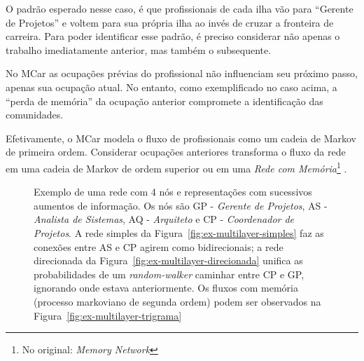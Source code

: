 \documentclass[12pt,a4paper]{article}
\begin{document}
O padrão esperado nesse caso, é que profissionais de cada ilha vão para \enquote{Gerente de Projetos} e voltem para sua própria ilha ao invés de cruzar a fronteira de carreira. Para poder identificar esse padrão, é preciso considerar não apenas o trabalho imediatamente anterior, mas também o subsequente.

No MCar as ocupações prévias do profissional não influenciam seu próximo passo, apenas sua ocupação atual. No entanto, como exemplificado no caso acima, a \enquote{perda de memória} da ocupação anterior compromete a identificação das comunidades.

Efetivamente, o MCar modela o fluxo de profissionais como um cadeia de Markov de primeira ordem. Considerar ocupações anteriores transforma o fluxo da rede em uma cadeia de Markov de ordem superior ou em uma \textit{Rede com Memória}\footnote{No original: \textit{Memory Network}} \cite{Edler2017-kt}.

\begin{figure}[htb]
    \centering
    \caption{Exemplo de uma rede com 4 nós e representações com sucessivos aumentos de informação. Os nós são GP - \textit{Gerente de Projetos}, AS - \textit{Analista de Sistemas}, AQ - \textit{Arquiteto} e CP - \textit{Coordenador de Projetos}. A rede simples da Figura~\ref{fig:ex-multilayer-simples} faz as conexões entre AS e CP agirem como bidirecionais; a rede direcionada da Figura~\ref{fig:ex-multilayer-direcionada} unifica as probabilidades de um \textit{random-walker} caminhar entre CP e GP, ignorando onde estava anteriormente. Os fluxos com memória (processo markoviano de segunda ordem) podem ser observados na Figura~\ref{fig:ex-multilayer-trigrama}}
\end{figure}
\end{document}

